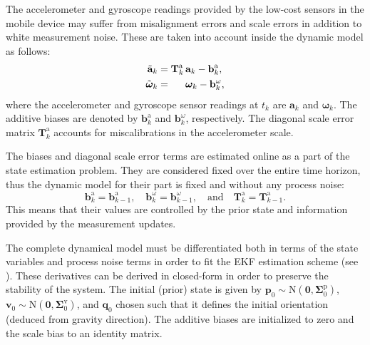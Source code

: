 \documentclass[conference]{ieeetran}
\newcommand{\N}{\mathrm{N}}
\newcommand{\mbf}[1]{\mathbf{#1}}
\newcommand{\vect}[1]{\mbf{#1}}
\newcommand{\vectb}[1]{\bm{#1}}
\begin{document}
The accelerometer and gyroscope readings provided by the low-cost sensors in the mobile device may suffer from misalignment errors and scale errors in addition to white measurement noise. These are taken into account inside the dynamic model as follows:
\begin{equation}
\begin{split}
  \tilde{\vect{a}}_k &= \vect{T}_k^\mathrm{a} \, \vect{a}_k - \vect{b}^\mathrm{a}_k, \\
  \tilde{\vectb{\omega}}_k &= \hphantom{\vect{T}_k^\mathrm{a} \, }\vectb{\omega}_k - \vect{b}^\omega_k,
\end{split}
\end{equation}
where the accelerometer and gyroscope sensor readings at $t_k$ are $\vect{a}_k$ and $\vectb{\omega}_k$. The additive biases are denoted by $\vect{b}^\mathrm{a}_k$ and $\vect{b}^\omega_k$, respectively. The diagonal scale error matrix $\vect{T}_k^\mathrm{a}$ accounts for miscalibrations in the accelerometer scale.

The biases and diagonal scale error terms are estimated online as a part of the state estimation problem. They are considered fixed over the entire time horizon, thus the dynamic model for their part is fixed and without any process noise: 
\begin{equation}
  \vect{b}^\mathrm{a}_k = \vect{b}^\mathrm{a}_{k-1}, \quad
  \vect{b}^{\omega}_k = \vect{b}^{\omega}_{k-1}, \quad \text{and} \quad
  \vect{T}_k^\mathrm{a} = \vect{T}_{k-1}^\mathrm{a}.
\end{equation}
This means that their values are controlled by the prior state and information provided by the measurement updates.

The complete dynamical model must be differentiated both in terms of the state variables and process noise terms in order to fit the EKF estimation scheme (see  \cite{Sarkka:2013}). These derivatives can be derived in closed-form in order to preserve the stability of the system.
The initial (prior) state is given by $\vect{p}_0 \sim \N(\vect{0}, \vectb{\Sigma}_0^\mathrm{p})$,  $\vect{v}_0 \sim \N(\vect{0}, \vectb{\Sigma}_0^\mathrm{v})$, and  $\vect{q}_0$ chosen such that it defines the initial orientation (deduced from gravity direction). The additive biases are initialized to zero and the scale bias to an identity matrix.
\end{document}
